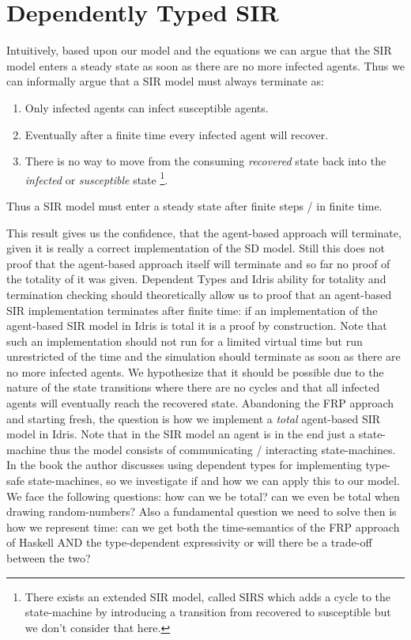 \section{Dependently Typed SIR}
Intuitively, based upon our model and the equations we can argue that the SIR model enters a steady state as soon as there are no more infected agents. Thus we can informally argue that a SIR model must always terminate as:
\begin{enumerate}
	\item Only infected agents can infect susceptible agents.
	\item Eventually after a finite time every infected agent will recover.
	\item There is no way to move from the consuming \textit{recovered} state back into the \textit{infected} or \textit{susceptible} state \footnote{There exists an extended SIR model, called SIRS which adds a cycle to the state-machine by introducing a transition from recovered to susceptible but we don't consider that here.}.
\end{enumerate}

Thus a SIR model must enter a steady state after finite steps / in finite time. 

This result gives us the confidence, that the agent-based approach will terminate, given it is really a correct implementation of the SD model. Still this does not proof that the agent-based approach itself will terminate and so far no proof of the totality of it was given. Dependent Types and Idris ability for totality and termination checking should theoretically allow us to proof that an agent-based SIR implementation terminates after finite time: if an implementation of the agent-based SIR model in Idris is total it is a proof by construction. Note that such an implementation should not run for a limited virtual time but run unrestricted of the time and the simulation should terminate as soon as there are no more infected agents. We hypothesize that it should be possible due to the nature of the state transitions where there are no cycles and that all infected agents will eventually reach the recovered state. 
Abandoning the FRP approach and starting fresh, the question is how we implement a \textit{total} agent-based SIR model in Idris. Note that in the SIR model an agent is in the end just a state-machine thus the model consists of communicating / interacting state-machines. In the book \cite{brady_type-driven_2017} the author discusses using dependent types for implementing type-safe state-machines, so we investigate if and how we can apply this to our model. We face the following questions: how can we be total? can we even be total when drawing random-numbers? Also a fundamental question we need to solve then is how we represent time: can we get both the time-semantics of the FRP approach of Haskell AND the type-dependent expressivity or will there be a trade-off between the two?

